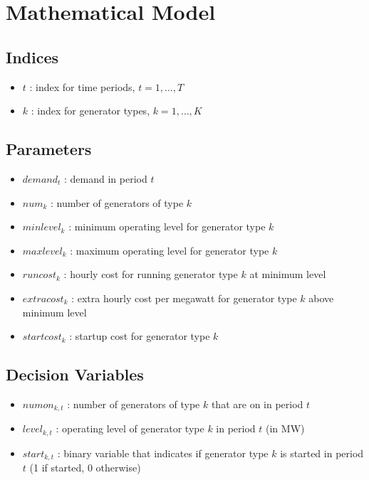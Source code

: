 \documentclass{article}
\begin{document}
\section*{Mathematical Model}

\subsection*{Indices}
\begin{itemize}
    \item \( t \) : index for time periods, \( t = 1, \ldots, T \)
    \item \( k \) : index for generator types, \( k = 1, \ldots, K \)
\end{itemize}

\subsection*{Parameters}
\begin{itemize}
    \item \( demand_t \) : demand in period \( t \)
    \item \( num_k \) : number of generators of type \( k \)
    \item \( minlevel_k \) : minimum operating level for generator type \( k \)
    \item \( maxlevel_k \) : maximum operating level for generator type \( k \)
    \item \( runcost_k \) : hourly cost for running generator type \( k \) at minimum level
    \item \( extracost_k \) : extra hourly cost per megawatt for generator type \( k \) above minimum level
    \item \( startcost_k \) : startup cost for generator type \( k \)
\end{itemize}

\subsection*{Decision Variables}
\begin{itemize}
    \item \( numon_{k,t} \) : number of generators of type \( k \) that are on in period \( t \)
    \item \( level_{k,t} \) : operating level of generator type \( k \) in period \( t \) (in MW)
    \item \( start_{k,t} \) : binary variable that indicates if generator type \( k \) is started in period \( t \) (1 if started, 0 otherwise)
\end{itemize}
\end{document}
